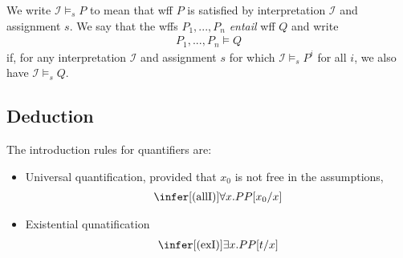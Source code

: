 \documentclass{article}
\begin{document}
\begin{definition}[Entailment]
	We write $\mathcal{I}\vDash_s P$ to mean that wff $P$ is satisfied by interpretation $\mathcal{I}$ and
	assignment $s$.  We say that the wffs $P_1,...,P_n$ \emph{entail} wff $Q$ and write
	\begin{align*}
		P_1,...,P_n\vDash Q
	\end{align*}
	if, for any interpretation $\mathcal{I}$ and assignment $s$ for which $\mathcal{I}\vDash_s P^i$ for all $i$,
	we also have $\mathcal{I}\vDash_s Q$.
\end{definition}

\subsection{Deduction}

\begin{definition}
	The introduction rules for quantifiers are:
	\begin{itemize}
		\item Universal quantification, provided that $x_0$ is not free in the assumptions, \begin{align*}
			      \infer[(\text{allI})]{\forall x. P}{P[x_0/x]}
		      \end{align*}
		\item Existential qunatification \begin{align*}
			      \infer[(\text{exI})]{\exists x.P}{P[t/x]}
		      \end{align*}
	\end{itemize}
\end{definition}
\end{document}
